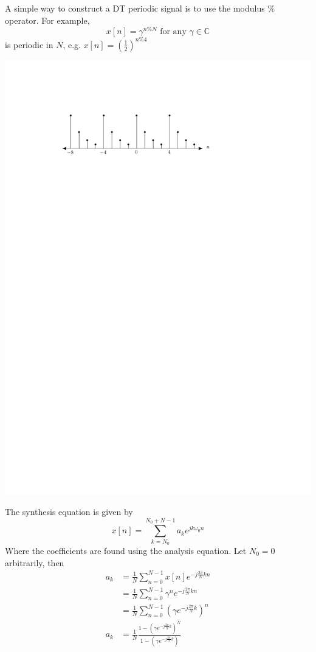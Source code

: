 \begin{example}
  A simple way to construct a DT periodic signal is to use the modulus $\%$ operator. For example,
  \[
  x[n] = \gamma^{n \% N} \mbox{ for any } \gamma \in \mathbb{C}
  \]
  is periodic in $N$, e.g. $x[n] = \left(\frac{1}{2}\right)^{n \% 4}$
  \begin{center}
    \includegraphics[scale=1]{graphics/dtfs_example1.pdf}
  \end{center}

  The synthesis equation is given by
  \[
  x[n] = \sum\limits_{k = N_0}^{N_0 + N-1} a_k e^{jk\omega_0n}
  \]
  Where the coefficients are found using the analysis equation. Let $N_0 = 0$ arbitrarily, then
  \begin{align*}
    a_k &= \frac{1}{N} \sum\limits_{n = 0}^{N-1} x[n]e^{-j\frac{2\pi}{N} k n }\\
    &= \frac{1}{N} \sum\limits_{n = 0}^{N-1} \gamma^n e^{-j\frac{2\pi}{N} k n }\\
    &= \frac{1}{N} \sum\limits_{n = 0}^{N-1} \left(\gamma e^{-j\frac{2\pi}{N} k}\right)^n\\
    a_k &= \frac{1}{N} \frac{1-\left(\gamma e^{-j\frac{2\pi}{N} k}\right)^N}{1-\left(\gamma e^{-j\frac{2\pi}{N} k}\right)}
  \end{align*}


\end{example}
